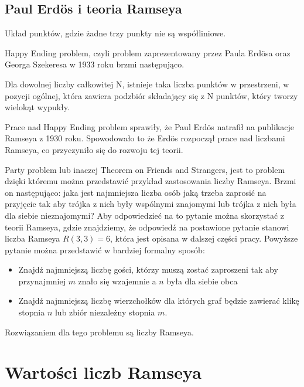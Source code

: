\subsection{Paul Erd\"os i teoria Ramseya}

\begin{definition}
 Układ punktów, gdzie żadne trzy punkty nie są współliniowe. \cite{gpos}
\end{definition}

Happy Ending problem, czyli problem zaprezentowany przez Paula Erd\"osa oraz Georga Szekeresa w 1933 roku brzmi następująco. 

\begin{theorem}
Dla dowolnej liczby całkowitej N, istnieje taka liczba punktów w przestrzeni, w pozycji ogólnej, która zawiera podzbiór składający się z N punktów, który tworzy wielokąt wypukły.
 \cite{erdoshappy} 
\end{theorem}

Prace nad Happy Ending problem sprawiły, że Paul Erd\"os natrafił na publikacje Ramseya z 1930 roku\cite{theory}. Spowodowało to że Erd\"os rozpoczął prace nad liczbami Ramseya, co przyczyniło się do rozwoju tej teorii.


\hfill  \par
Party problem lub inaczej Theorem on Friends and Strangers, jest to problem dzięki któremu można przedstawić przykład zastosowania liczby Ramseya. Brzmi on następująco: jaka jest najmniejsza liczba osób jaką trzeba zaprosić na przyjęcie tak aby trójka z nich były wspólnymi znajomymi lub trójka z nich była dla siebie nieznajomymi\cite{partyproblem}? Aby odpowiedzieć na to pytanie można skorzystać z teorii Ramseya, gdzie znajdziemy, że odpowiedź na postawione pytanie stanowi liczba Ramseya $R(3,3)=6$, która jest opisana w dalszej części pracy. Powyższe pytanie można przedstawić w bardziej formalny sposób: 
\begin{itemize}
\item Znajdź najmniejszą liczbę gości, którzy muszą zostać zaproszeni tak aby przynajmniej $m$ znało się wzajemnie a $n$ była dla siebie obca \cite{partyformal}
\item Znajdź najmniejszą liczbę wierzchołków dla których graf będzie zawierać klikę stopnia $n$ lub zbiór niezależny stopnia $m$.
\end{itemize}
Rozwiązaniem dla tego problemu są liczby Ramseya. 

\section{Wartości liczb Ramseya}

